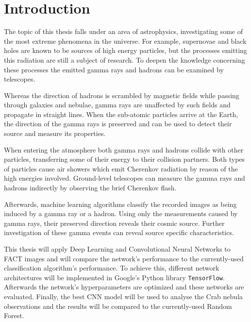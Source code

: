 \chapter{Introduction}
The topic of this thesis falls under an area of astrophysics, investigating some of the most extreme phenomena in the universe.
For example, supernovae and black holes are known to be sources of high energy particles,
but the processes emitting this radiation are still a subject of research.
To deepen the knowledge concerning these processes the emitted gamma rays and hadrons can be examined by telescopes.

Whereas the direction of hadrons is scrambled by magnetic fields while passing through galaxies and nebulae,
gamma rays are unaffected by such fields and propagate in straight lines.
When the sub-atomic particles arrive at the Earth, the direction of the gamma rays is preserved
and can be used to detect their source and measure its properties.

When entering the atmosphere both gamma rays and hadrons collide with other particles,
transferring some of their energy to their collision partners.
Both types of particles cause air showers which emit Cherenkov radiation by reason of the high energies involved.
Ground-level telescopes can measure the gamma rays and hadrons indirectly by observing the brief Cherenkov flash.

Afterwards, machine learning algorithms classify the recorded images as being induced by a gamma ray or a hadron.
Using only the measurements caused by gamma rays, their preserved direction reveals their cosmic source.
Further investigation of these gamma events can reveal source specific characteristics.

This thesis will apply Deep Learning and Convolutional Neural Networks to FACT images and
will compare the network's performance to the currently-used classification algorithm's performance.
To achieve this, different network architectures will be implemented in Google's Python library \texttt{TensorFlow}.
Afterwards the network's hyperparameters are optimized and these networks are evaluated.
Finally, the best CNN model will be used to analyse the Crab nebula observations
and the results will be compared to the currently-used Random Forest.
